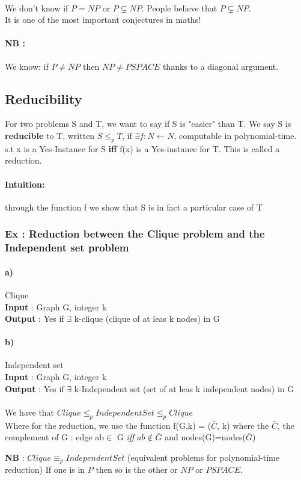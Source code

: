\paragraph{} We don't know if $P=NP$ or $P\subsetneq NP$. People believe that $P\subsetneq NP$.\\
It is one of the most important conjectures in maths!

\paragraph{NB :}
We know: if $P\neq NP$ then $NP\neq PSPACE$ thanks to a diagonal argument.

\subsection{Reducibility}
For two problems S and T, we want to say if S is "easier" than T.
We say S is \textbf{reducible} to T, written $S \leq_p T$, 
if $\exists f:N\leftarrow N$, computable in polynomial-time. \\
s.t x is a Yes-Instance for S \textbf{iff} f(x) is a Yes-instance for T.
This is called a reduction.

\paragraph{Intuition:} through the function f we show that S is in fact a particular case of T

\subsubsection{Ex : Reduction between the Clique problem and the Independent set problem}
\paragraph{a)} Clique\\
\textbf{Input} : Graph G, integer k\\
\textbf{Output} : Yes if $\exists$ k-clique (clique of at leas k nodes) in G

\paragraph{b)} Independent set\\
\textbf{Input} : Graph G, integer k\\
\textbf{Output} : Yes if $\exists$ k-Independent set (set of at leas k independent nodes) in G

\paragraph{} We have that $Clique \leq_p IndependentSet \leq_p Clique$\\
Where for the reduction, we use the function f(G,k) = ($\bar{C}$, k) where the $\bar{C}$, the complement of G : edge ab$\in$ G \emph{iff} $ab\notin \bar{G}$ and
nodes(G)=nodes($\bar{G}$)

\textbf{NB} : $Clique \equiv_p IndependentSet$ (equivalent problems for polynomial-time reduction)
If one is in $P$ then so is the other or $NP$ or $PSPACE$.

